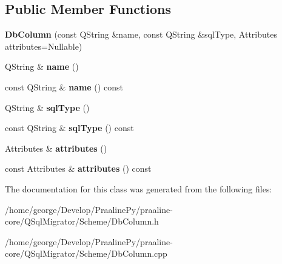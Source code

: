 \subsection*{Public Member Functions}
\begin{DoxyCompactItemize}
\item 
\mbox{\label{class_q_sql_migrator_1_1_scheme_1_1_db_column_a6ec830b154e4fe6ac3125d4c1e3329f6}} 
{\bfseries Db\+Column} (const Q\+String \&name, const Q\+String \&sql\+Type, Attributes attributes=Nullable)
\item 
\mbox{\label{class_q_sql_migrator_1_1_scheme_1_1_db_column_af7acd04fb5fb8e8bbd6b5ac597e16938}} 
Q\+String \& {\bfseries name} ()
\item 
\mbox{\label{class_q_sql_migrator_1_1_scheme_1_1_db_column_a0e230431487e6d14901b8a5d7c319419}} 
const Q\+String \& {\bfseries name} () const
\item 
\mbox{\label{class_q_sql_migrator_1_1_scheme_1_1_db_column_a3694b80724b5a887536ae61700a37f4c}} 
Q\+String \& {\bfseries sql\+Type} ()
\item 
\mbox{\label{class_q_sql_migrator_1_1_scheme_1_1_db_column_a643559950d0a4b0228a4fa73937b17d1}} 
const Q\+String \& {\bfseries sql\+Type} () const
\item 
\mbox{\label{class_q_sql_migrator_1_1_scheme_1_1_db_column_ad90d07bf9582b58c4b4239c21437746b}} 
Attributes \& {\bfseries attributes} ()
\item 
\mbox{\label{class_q_sql_migrator_1_1_scheme_1_1_db_column_a6d6ee23ef68b64bde9c8e4a2dce5cdad}} 
const Attributes \& {\bfseries attributes} () const
\end{DoxyCompactItemize}


The documentation for this class was generated from the following files\+:\begin{DoxyCompactItemize}
\item 
/home/george/\+Develop/\+Praaline\+Py/praaline-\/core/\+Q\+Sql\+Migrator/\+Scheme/Db\+Column.\+h\item 
/home/george/\+Develop/\+Praaline\+Py/praaline-\/core/\+Q\+Sql\+Migrator/\+Scheme/Db\+Column.\+cpp\end{DoxyCompactItemize}

